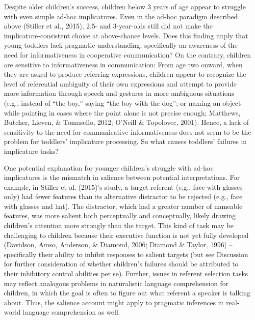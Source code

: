 \documentclass[mask,man]{apa6}
\theoremstyle{definition}
\theoremstyle{definition}
\theoremstyle{definition}
\theoremstyle{remark}
\begin{document}
Despite older children's success, children below 3 years of age appear
to struggle with even simple ad-hoc implicatures. Even in the ad-hoc
paradigm described above (Stiller et al., 2015), 2.5- and 3-year-olds
still did not make the implicature-consistent choice at above-chance
levels. Does this finding imply that young toddlers lack pragmatic
understanding, specifically an awareness of the need for informativeness
in cooperative communication? On the contrary, children are sensitive to
informativeness in communication: From age two onward, when they are
asked to produce referring expressions, children appear to recognize the
level of referential ambiguity of their own expressions and attempt to
provide more information through speech and gestures in more ambiguous
situations (e.g., instead of ``the boy,'' saying ``the boy with the
dog''; or naming an object while pointing in cases where the point alone
is not precise enough; Matthews, Butcher, Lieven, \& Tomasello, 2012;
O'Neill \& Topolovec, 2001). Hence, a lack of sensitivity to the need
for communicative informativeness does not seem to be the problem for
toddlers' implicature processing. So what causes toddlers' failures in
implicature tasks?

One potential explanation for younger children's struggle with ad-hoc
implicatures is the mismatch in salience between potential
interpretations. For example, in Stiller et al. (2015)'s study, a target
referent (e.g., face with glasses only) had fewer features than its
alternative distractor to be rejected (e.g., face with glasses and hat).
The distractor, which had a greater number of nameable features, was
more salient both perceptually and conceptually, likely drawing
children's attention more strongly than the target. This kind of task
may be challenging to children because their executive function is not
yet fully developed (Davidson, Amso, Anderson, \& Diamond, 2006; Diamond
\& Taylor, 1996) -- specifically their ability to inhibit responses to
salient targets (but see Discussion for further consideration of whether
children's failures should be attributed to their inhibitory control
abilities per se). Further, issues in referent selection tasks may
reflect analogous problems in naturalistic language comprehension for
children, in which the goal is often to figure out what referent a
speaker is talking about. Thus, the salience account might apply to
pragmatic inferences in real-world language comprehension as well.
\end{document}

